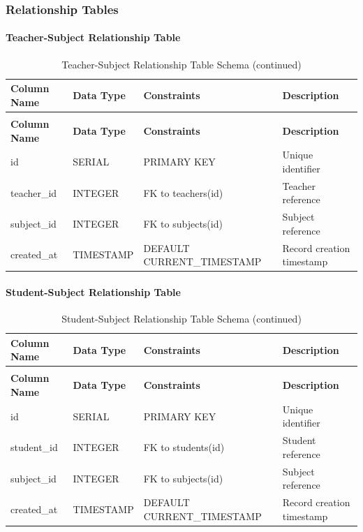 \documentclass[12pt,a4paper]{report}
\begin{document}
\subsubsection{Relationship Tables}

\paragraph{Teacher-Subject Relationship Table}
\begin{longtable}{|p{3cm}|p{3cm}|p{2cm}|p{6cm}|}
\caption{Teacher-Subject Relationship Table Schema}
\label{tab:teacher-subjects}\\
\hline
\textbf{Column Name} & \textbf{Data Type} & \textbf{Constraints} & \textbf{Description} \\
\hline
\endfirsthead
\caption[]{Teacher-Subject Relationship Table Schema (continued)}\\
\hline
\textbf{Column Name} & \textbf{Data Type} & \textbf{Constraints} & \textbf{Description} \\
\hline
\endhead
id & SERIAL & PRIMARY KEY & Unique identifier \\
\hline
teacher\_id & INTEGER & FK to teachers(id) & Teacher reference \\
\hline
subject\_id & INTEGER & FK to subjects(id) & Subject reference \\
\hline
created\_at & TIMESTAMP & DEFAULT CURRENT\_TIMESTAMP & Record creation timestamp \\
\hline
\end{longtable}

\paragraph{Student-Subject Relationship Table}
\begin{longtable}{|p{3cm}|p{3cm}|p{2cm}|p{6cm}|}
\caption{Student-Subject Relationship Table Schema}
\label{tab:student-subjects}\\
\hline
\textbf{Column Name} & \textbf{Data Type} & \textbf{Constraints} & \textbf{Description} \\
\hline
\endfirsthead
\caption[]{Student-Subject Relationship Table Schema (continued)}\\
\hline
\textbf{Column Name} & \textbf{Data Type} & \textbf{Constraints} & \textbf{Description} \\
\hline
\endhead
id & SERIAL & PRIMARY KEY & Unique identifier \\
\hline
student\_id & INTEGER & FK to students(id) & Student reference \\
\hline
subject\_id & INTEGER & FK to subjects(id) & Subject reference \\
\hline
created\_at & TIMESTAMP & DEFAULT CURRENT\_TIMESTAMP & Record creation timestamp \\
\hline
\end{longtable}
\end{document}

